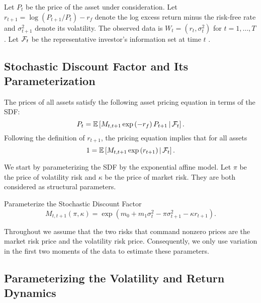 \documentclass[11pt, letterpaper, twoside]{article}
\begin{document}
Let $P_t$ be the price of the asset under consideration. Let $r_{t+1}=\log(P_{t+1}/P_t)-r_f$ denote the log excess return minus the risk-free rate and $\sigma^2_{t+1}$ denote its volatility. The observed data is $W_t=(r_t,\sigma^2_{t})$ for $t=1,\ldots,T$. 
Let $\mathcal{F}_t$ be the representative investor's information set at time $t$ . 

\subsection{Stochastic Discount Factor and Its Parameterization}\label{sec:deriving_sdf_functions}

The prices of all assets satisfy the following asset pricing equation in terms of the SDF:
%
  \begin{equation}
    P_t = \operatorname{\mathbb{E}}\left[M_{t,t+1} \exp\left(-r_f\right) P_{t+1} \,\middle\vert\, \mathcal{F}_t \right]. 
  \end{equation}
%
  Following the definition of $r_{t+1}$, the pricing equation implies that for all assets
%
\begin{equation}
1 = \operatorname{\mathbb{E}}\left[M_{t,t+1} \exp\left(r_{t+1}\right) \,\middle\vert\, \mathcal{F}_t \right].
\end{equation}

We start by parameterizing the SDF by the exponential affine model. Let $\pi$ be the price of volatility risk and $\kappa$ be the price of market risk. They are both considered as structural parameters.

\begin{defn}{Parameterize the Stochastic Discount Factor}
 \label{defn:SDF}
%
 \begin{equation}
    M_{t,t+1}(\pi, \kappa) = \exp\left(m_{0} + m_1 \sigma_t^2 - \pi \sigma^2_{t+1} - \kappa r_{t+1}\right). 
 \end{equation}
\end{defn}

Throughout we assume that the two risks that command nonzero prices are the market risk price and the volatility risk price. Consequently, we only use variation in the first two moments of the data to estimate these parameters. 


\subsection{Parameterizing the Volatility and Return Dynamics}
\end{document}
